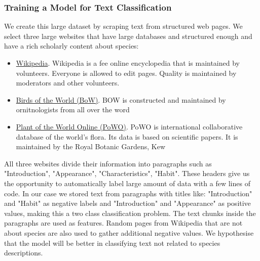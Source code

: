\documentclass[a4paper, 12pt, oneside]{book} %
\begin{document}
\subsubsection{Training a Model for Text Classification} \label{par:reedloss}
We create this large dataset by scraping text from structured web pages.
We select three large websites that have large databases and structured enough and have a rich scholarly content about species:
\begin{itemize}
    \item \href{www.wikipedia.com}{Wikipedia}. Wikipedia is a fee online encyclopedia that is maintained by volunteers. Everyone is allowed to edit pages. Quality is maintained by moderators and other volunteers.
    \item \href{https://birdsoftheworld.org/bow/home}{Birds of the World (BoW)}. BOW is constructed and maintained by ornitnologists from all over the word \autocite{billerman_birds_2020}
    \item \href{https://powo.science.kew.org/}{Plant of the World Online (PoWO)}. PoWO is international collaborative database of the world's flora. Its data is based on scientific papers. It is maintained by the Royal Botanic Gardens, Kew  \autocite{facilitated_by_the_royal_botanic_gardens_plants_2019}
\end{itemize}
All three websites divide their information into paragraphs such as "Introduction", "Appearance", "Characteristics", "Habit".
These headers give us the opportunity to automatically label large amount of data with a few lines of code.
In our case we stored text from paragraphs with titles like:  "Introduction" and "Habit" as negative labels and "Introduction" and "Appearance" as positive values, making this a two class classification problem.
The text chunks inside the paragraphs are used as features.
Random pages from Wikipedia that are not about species are also used to gather additional negative values.
We hypothesise that the model will be better in classifying text not related to species descriptions.
\end{document}

